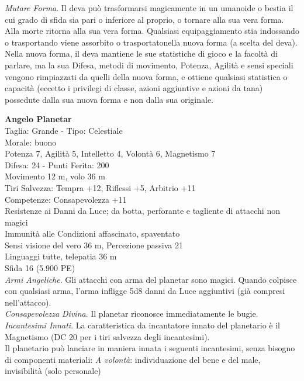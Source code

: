 \begin{multicols}{2}
\textit{Mutare Forma}. Il deva può trasformarsi magicamente in un umanoide o bestia il cui grado di sfida sia pari o inferiore al proprio, o tornare alla sua vera forma. Alla morte ritorna alla sua vera forma. Qualsiasi equipaggiamento stia indossando o trasportando viene assorbito o trasportatonella nuova forma (a scelta del deva).  Nella nuova forma, il deva mantiene le sue statistiche di gioco e la facoltà di parlare, ma la sua Difesa, metodi di movimento, Potenza,
Agilità e sensi speciali vengono rimpiazzati da quelli della nuova forma, e ottiene qualsiasi statistica o capacità (eccetto i privilegi di classe, azioni aggiuntive e azioni da tana) possedute dalla sua nuova forma e non dalla sua originale.

\medskip\textbf{Angelo Planetar}\\
Taglia: Grande  - Tipo: Celestiale\\
Morale: buono\\
Potenza 7, Agilità 5, Intelletto 4, Volontà 6, Magnetismo 7\\
Difesa: 24 - Punti Ferita: 200\\
Movimento 12 m, volo 36 m\\
Tiri Salvezza: Tempra +12, Riflessi +5, Arbitrio +11\\
Competenze: Consapevolezza +11\\
Resistenze ai Danni da Luce; da botta, perforante e tagliente di attacchi non magici\\
Immunità alle Condizioni affascinato, spaventato\\
Sensi visione del vero 36 m, Percezione passiva 21\\
Linguaggi tutte, telepatia 36 m\\
Sfida 16 (5.900 PE)\\
\textit{Armi Angeliche}. Gli attacchi con arma del planetar sono magici. Quando colpisce con qualsiasi arma, l’arma infligge 5d8 danni da Luce aggiuntivi (già compresi nell’attacco).\\
\textit{Consapevolezza Divina}. Il planetar riconosce immediatamente le bugie.\\
\textit{Incantesimi Innati}. La caratteristica da incantatore innato del planetario è il Magnetismo (DC 20 per i tiri salvezza degli incantesimi).\\
Il planetario può lanciare in maniera innata i seguenti incantesimi, senza bisogno di componenti materiali: 
\textit{A volontà}: individuazione del bene e del male, invisibilità (solo personale)\\

\end{multicols}
